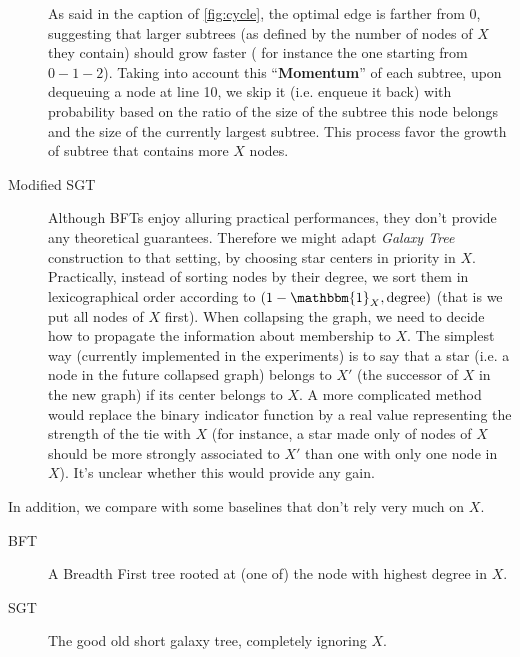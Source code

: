 \documentclass[a4paper,final,notitlepage,11pt,svgnames]{scrartcl}
\begin{document}
\begin{description}
		As said in the caption of \autoref{fig:cycle}, the optimal edge is
		farther from 0, suggesting that larger subtrees (as defined by the
		number of nodes of $X$ they contain) should grow faster ( for instance
		the one starting from $0-1-2$). Taking into account this
		\enquote{\textbf{Momentum}} of each subtree, upon dequeuing a node at
		line 10, we skip it (i.e. enqueue it back) with probability based on
		the ratio of the size of the subtree this node belongs and the size of
		the currently largest subtree. This process favor the growth of subtree
		that contains more $X$ nodes.

	\item[Modified SGT] Although BFTs enjoy alluring practical performances,
		they don't provide any theoretical guarantees. Therefore we might adapt
		\emph{Galaxy Tree} construction to that setting, by choosing star
		centers in priority in $X$. Practically, instead of sorting nodes by
		their degree, we sort them in lexicographical order according to $(1 -
		\mathbbm{1}_X, \textrm{degree})$ (that is we put all nodes of $X$
		first). When collapsing the graph, we need to decide how to propagate
		the information about membership to $X$. The simplest way (currently
		implemented in the experiments) is to say that a star (i.e. a node in
		the future collapsed graph) belongs to $X'$ (the successor of $X$ in
		the new graph) if its center belongs to $X$. A more complicated method
		would replace the binary indicator function by a real value
		representing the strength of the tie with $X$ (for instance, a star
		made only of nodes of $X$ should be more strongly associated to $X'$
		than one with only one node in $X$). It's unclear whether this would
		provide any gain.

\end{description}

In addition, we compare with some baselines that don't rely very much on $X$.

\begin{description}
	\item[BFT] A Breadth First tree rooted at (one of) the node with highest
		degree in $X$.
	\item[SGT] The good old short galaxy tree, completely ignoring $X$.
\end{description}
\end{document}
